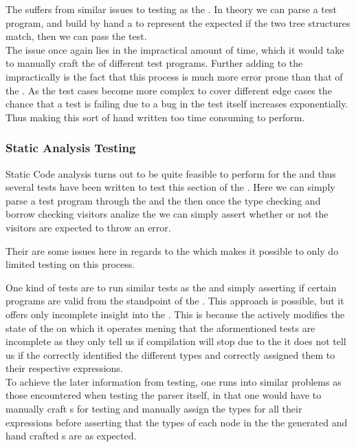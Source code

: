 The \parser{} suffers from similar issues to testing as the \lexer. In theory we can
parse a test program, and build by hand a \ast{} to represent the expected \ast{}
if the two tree structures match, then we can pass the test. \\ 

The issue once again lies in the impractical amount of time, which it would take to
manually craft the \ast{} of different test programs. Further adding to the
impractically is the fact that this process is much more error prone than that of the
\lexer. As the test cases become more complex to cover different edge cases the
chance that a test is failing due to a bug in the test itself increases
exponentially. Thus making this sort of hand written too time consuming to perform.

\subsubsection{Static Analysis Testing}
\label{sec:testStatic}

Static Code analysis turns out to be quite feasible to perform for the
\borrowChecker{} and thus several tests
have been written to test this section of the \static. Here we can simply parse a
test program through the \lexer{} and the \parser{} then once the type checking and
borrow checking visitors analize the \ast{} we can simply assert whether or not the
visitors are expected to throw an error.

Their are some issues here in regards to the \typeChecker{} which makes it possible
to only do limited testing on this process. 

One kind of tests are to run similar tests as the \borrowChecker{} and simply
asserting if certain programs are valid from the standpoint of the \typeChecker. This
approach is possible, but it offers only incomplete insight into the \typeChecker{}.
This is because the \typeChecker actively modifies the state of the \ast{} on which
it operates mening that the aformentioned tests are incomplete as they only tell us
if compilation will stop due to the \typeChecker{} it does not tell us if the
\typeChecker{} correctly identified the different types and correctly assigned them
to their respective expressions. \\

To achieve the later information from testing, one runs into similar problems as those
encountered when testing the parser itself, in that one would have to manually craft
\ast s for testing and manually assign the types for all their expressions before
asserting that the types of each node in the the generated and hand crafted \ast s
are as expected.

